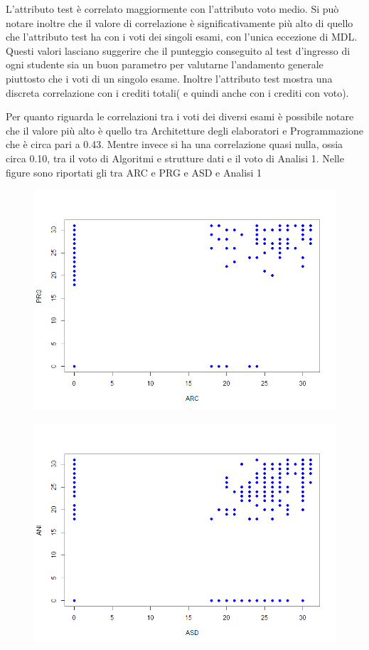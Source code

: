 \documentclass[12pt]{article}
\begin{document}
L'attributo test è correlato maggiormente con l'attributo voto medio. 
Si può notare inoltre che il valore di correlazione è significativamente più alto di quello che l'attributo test ha con i voti dei singoli esami, con l'unica eccezione di MDL.
Questi valori lasciano suggerire che il punteggio conseguito al test d'ingresso di ogni studente sia un buon parametro per valutarne l'andamento generale piuttosto che i voti di un singolo esame.
Inoltre l'attributo test mostra una discreta correlazione con i crediti totali( e quindi anche con i crediti con voto).

Per quanto riguarda le correlazioni tra i voti dei diversi esami è possibile notare che il valore più alto è quello tra Architetture degli elaboratori e Programmazione che è circa pari a 0.43.
Mentre invece si ha una correlazione quasi nulla, ossia circa 0.10, tra il voto di Algoritmi e strutture dati e il voto di Analisi 1.
Nelle figure sono riportati gli tra ARC e PRG e ASD  e Analisi 1
\begin{figure}[H]
	\includegraphics[width=\textwidth]{img/arcPrg.png}
\end{figure}

\begin{figure}[h]
	\includegraphics[width=\textwidth]{img/asdAni.png}
\end{figure}
\end{document}
